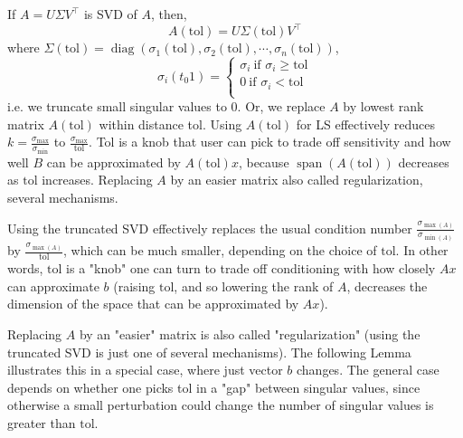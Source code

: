 \documentclass[11pt]{article}
\numberwithin{equation}{section}
\begin{document}
\begin{definition}
    If $A=U \Sigma V^{\top}$ is SVD of $A$, then, 
    $$A(\text{tol})=U\Sigma (\text{tol})V^\top$$ 
    where  $\Sigma (\text{tol})=\operatorname{diag}\left( \sigma_1 (\text{tol}),\sigma_2 (\text{tol}), \cdots, \sigma_n (\text{tol}) \right)$, 
    $$\sigma_{i}\left(t_{0} 1\right)=\left\{\begin{array}{l}
        \sigma_{i} \ \text{if } \sigma_i \geq \text{tol} \\
        0 \ \text{if } \sigma_i < \text{tol} \\
        \end{array}\right.$$
    i.e. we truncate small singular values to 0. Or, we replace $A$ by lowest rank matrix $A(\text{tol})$ within distance tol. Using $A(\text{tol})$ for LS effectively reduces
    $k=\frac{\sigma_{\operatorname{max}}} {\sigma_{\operatorname{min}}}$ to $\frac{\sigma_{\operatorname{max}}}{\mathrm{tol}}$. Tol is a knob  that user can pick to trade off sensitivity and how well $B$ can be approximated by 
    $A(\mathrm{tol})x$, because $\operatorname{span}(A(\mathrm{tol}))$ decreases as $\mathrm{tol}$ increases. Replacing $A$ by an easier matrix also called regularization, several mechanisms.
\end{definition}

Using the truncated SVD effectively replaces the usual condition number
$\frac{\sigma_{\operatorname{max}(A)}}{\sigma_{\operatorname{min}(A)}}$ by $\frac{\sigma_{\operatorname{max}(A)}}{\mathrm{tol}}$, which can be much smaller, 
depending on the choice of $\mathrm{tol}$. In other words, $\mathrm{tol}$ is a "knob" one can turn to trade off conditioning with how closely $Ax$
can approximate $b$ (raising $\mathrm{tol}$, and so lowering the rank of $A$, decreases the dimension of the space that can be approximated by $Ax$).

Replacing $A$ by an "easier" matrix is also called "regularization" (using the truncated SVD is just one of several mechanisms). 
The following Lemma illustrates this in a special case, where just vector $b$ changes. 
The general case depends on whether one picks tol in a "gap" between singular values, 
since otherwise a small perturbation could change the number of singular values is greater than $\mathrm{tol}$.
\end{document}
